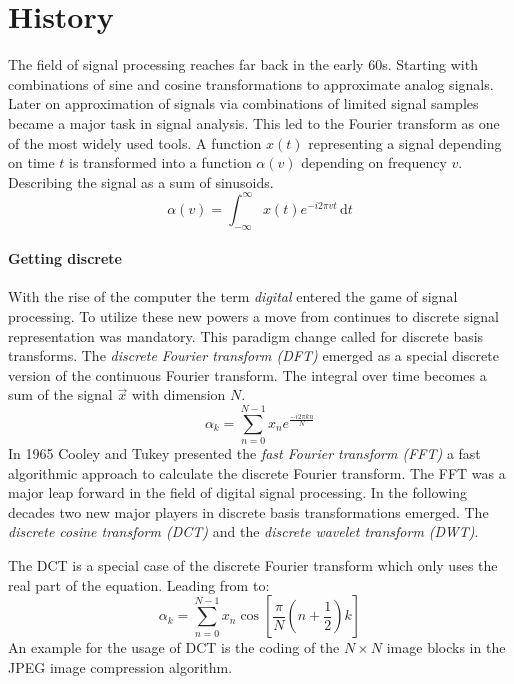 \section{History}
\label{sec:history}
The field of signal processing reaches far back in the early 60s.
Starting with combinations of sine and cosine transformations to approximate
analog signals. 
Later on approximation of signals via combinations of limited signal samples
became a major task in signal analysis. This led to the Fourier transform as one
of the most widely used tools. A function $x(t)$ representing a signal depending
on time $t$ is transformed into a function $\alpha(v)$ depending on frequency
$v$. Describing the signal as a sum of sinusoids. 
\begin{equation*}
\alpha\left(v\right) = \int_{-\infty}^{\infty} \! x(t)e^{-i2\pi
v t} \,
\mathrm{d}t\label{eq:ft}
\end{equation*}

\paragraph{Getting discrete}
With the rise of the computer the term \emph{digital} entered the
game of signal processing. To utilize these new powers a move from continues
to discrete signal representation was mandatory. This paradigm change called
for discrete basis transforms. The \emph{discrete Fourier transform (DFT)}
emerged as a special discrete version of the continuous Fourier transform. The
integral over time becomes a sum of the signal $\vec{x}$
with dimension $N$. 
\begin{equation}
 \alpha_k = \sum_{n=0}^{N-1}x_ne^{\frac{-i2\pi kn}{N}}\label{eq:dft}
\end{equation}
In 1965 Cooley and Tukey presented\cite{Cooley1965} the \emph{fast Fourier
transform (FFT)} a fast algorithmic approach to calculate the discrete
Fourier transform. The FFT was a major leap forward in the field of digital
signal processing. 
In the following decades two new major players in discrete basis
transformations emerged. The \emph{discrete cosine transform (DCT)} and the
\emph{discrete wavelet transform (DWT)}. 

The DCT is a special case of the discrete Fourier transform which only uses the
real part of the equation. Leading from  to:
\begin{equation*}
\alpha_k = \sum_{n=0}^{N-1}x_n\cos \left[ \frac{\pi}{N} \left(
n+\frac{1}{2}\right) k\right]
\end{equation*}
An example for the usage of DCT is the coding of the $N\times N$ image blocks in
the JPEG image compression algorithm.

